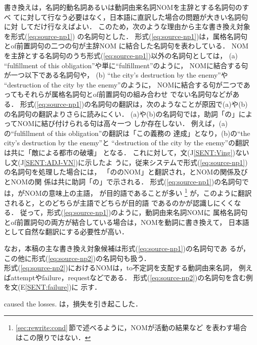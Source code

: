 書き換えは，名詞的動名詞あるいは動詞由来名詞NOMを主辞とする名詞句のすべ
てに対して行なう必要はなく，日本語に直訳した場合の問題が大きい名詞句に対
してだけ行なえばよい． 
このため，次のような理由から主な書き換え対象を形式(\ref{eq:source-np1})
の名詞句とした．
形式(\ref{eq:source-np1})は，属格名詞句とof前置詞句の二つの句が主辞NOM
に結合した名詞句を表わしている．
NOMを主辞とする名詞句のうち形式(\ref{eq:source-np1})以外の名詞句としては， 
(a) ``fulfillment of this obligation''や単に``fulfillment''のように，
NOMに結合する句が一つ以下である名詞句や，
(b) ``the city's destruction by the enemy''や
``destruction of the city by the enemy''のように，
NOMに結合する句が二つであってもそれらが属格名詞句とof前置詞句の組み合わせ
でない名詞句などがある．
形式(\ref{eq:source-np1})の名詞句の翻訳は，次のようなことが原因で(a)や(b)
の名詞句の翻訳よりさらに読みにくい．
(a)や(b)の名詞句では，助詞「の」によってNOMに結び付けられる句は高々一つ
しか存在しない．
例えば，(a)の``fulfillment of this obligation''の翻訳は「この義務の
達成」となり，(b)の``the city's destruction by the enemy''と
``destruction of the city by the enemy''の翻訳は共に「敵による都市の破壊」
となる．
これに対して，文(J\ref{SENT:Ving})ないし文(J\ref{SENT:ADJ-VN})に示したよ
うに，従来システムで形式(\ref{eq:source-np1})の名詞句を処理した場合には，
「\NP の\NPpost のNOM」と翻訳され，\NP とNOMの関係及び\NPpost とNOMの関
係は共に助詞「の」で示される．
形式(\ref{eq:source-np1})の名詞句では，\NP がNOMの意味上の主語，
\NPpost が目的語であることが多い
\footnote{\ref{sec:rewrite:cond}\,節で述べるように，NOMが活動の結果など
を表わす場合はこの限りではない．} 
が，このように翻訳されると，\NP と\NPpost のどちらが主語でどちらが目的語
であるのかが認識しにくくなる．
従って，形式(\ref{eq:source-np1})のように，動詞由来名詞NOMに
属格名詞句とof前置詞句の両方が結合している場合は，NOMを動詞に書き換えて，
日本語として自然な翻訳にする必要性が高い． 

なお，本稿の主な書き換え対象候補は形式(\ref{eq:source-np1})の名詞句であ
るが，この他に形式(\ref{eq:source-np2})の名詞句も扱う．
\begin{equation}
[\ \mbox{NP}_1\mbox{'s} \ \mbox{ADJ}^?\ \mbox{NOM}\ \mbox{to}\ \mbox{ADV}^?\ \mbox{VERB}\ ]
\label{eq:source-np2}
\end{equation}
形式(\ref{eq:source-np2})におけるNOMは，to不定詞を支配する動詞由来名詞，
例えばattemptやfailure，requestなどである．
形式(\ref{eq:source-np2})の名詞句を含む例を文(E\ref{SENT:failure})に
示す．
\begin{SENT}
 caused the losses.
は，損失を引き起こした．
\label{SENT:failure}
\end{SENT}

